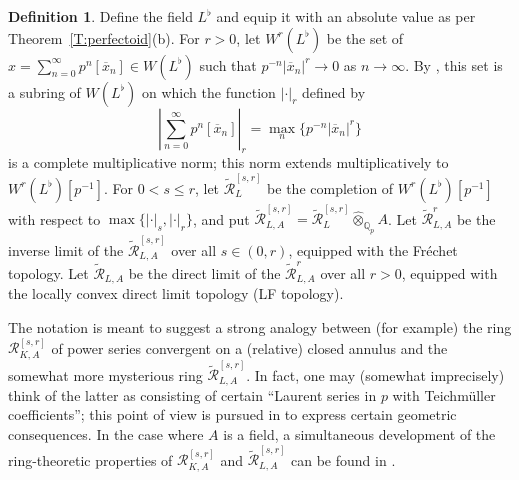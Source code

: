 \documentclass[12pt]{amsart}
\theoremstyle{definition}
\newtheorem{defn}[theorem]{Definition}
\numberwithin{equation}{theorem}
\newcommand{\QQ}{\mathbb{Q}}
\newcommand{\calR}{\mathcal{R}}
\begin{document}
\begin{defn}
Define the field $L^\flat$ and equip it with an absolute value as per
Theorem~\ref{T:perfectoid}(b). 
For $r>0$, let $W^r(L^\flat)$ be the set of $x = \sum_{n=0}^\infty p^n [\overline{x}_n] \in W(L^\flat)$ such that $p^{-n} \left| \overline{x}_n \right|^r \to 0$ as $n \to \infty$.
By \cite[Proposition~5.1.2]{kedlaya-liu1}, this set is a subring of $W(L^\flat)$ on which 
the function $\left| \cdot \right|_r$ defined by
\[
\left| \sum_{n=0}^\infty p^n [\overline{x}_n]  \right|_r = \max_n \{p^{-n} \left| \overline{x}_n \right|^r\}
\]
is a complete multiplicative norm; this norm extends multiplicatively to $W^r(L^\flat)[p^{-1}]$.
For $0 < s \leq r$, let $\tilde{\calR}^{[s,r]}_L$ be the completion of $W^r(L^\flat)[p^{-1}]$
with respect to $\max\{\left| \cdot \right|_s, \left| \cdot \right|_r\}$,
and put $\tilde{\calR}^{[s,r]}_{L,A} = \tilde{\calR}^{[s,r]}_L \widehat{\otimes}_{\QQ_p} A$.
Let $\tilde{\calR}^r_{L,A}$ be the inverse limit of the $\tilde{\calR}^{[s,r]}_{L,A}$ over all $s \in (0,r)$, equipped with the Fr\'echet topology. Let $\tilde{\calR}_{L,A}$ be the direct  limit of the $\tilde{\calR}^r_{L,A}$ over all $r>0$, equipped with the locally convex direct limit topology (LF topology).

The notation is meant to suggest a strong analogy between (for example) the ring $\calR^{[s,r]}_{K,A}$ of power series convergent on a (relative) closed annulus and the somewhat more mysterious ring $\tilde{\calR}^{[s,r]}_{L,A}$. In fact, one may (somewhat imprecisely) think of the latter as consisting of certain ``Laurent series in $p$ with Teichm\"uller coefficients''; this point of view is pursued in \cite{kedlaya-witt} to express certain geometric consequences. In the case where $A$ is a field, a simultaneous development of
the ring-theoretic properties of $\calR^{[s,r]}_{K,A}$ and $\tilde{\calR}^{[s,r]}_{L,A}$
can be found in \cite{kedlaya-revisited}.
\end{defn}
\end{document}
